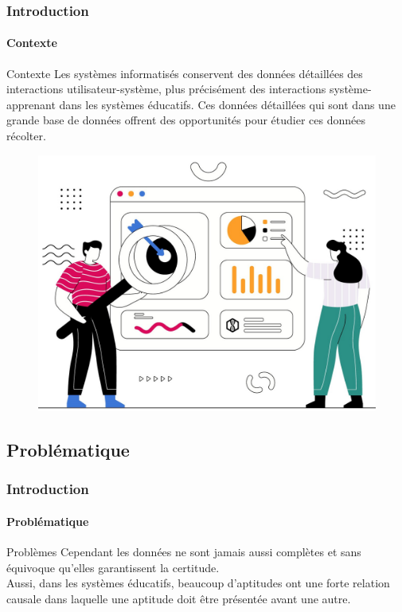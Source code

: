 \documentclass[aspectratio=169,professionalfonts, 12pt]{beamer}
\begin{document}
\begin{frame}
  \frametitle{Introduction}
  \framesubtitle{Contexte}
  \begin{minipage}{0.5\textwidth}
    \begin{block}{Contexte}
    Les systèmes informatisés conservent des données détaillées des interactions utilisateur-système, plus précisément des interactions système-apprenant dans les systèmes éducatifs. Ces données détaillées qui sont dans une grande base de données offrent des opportunités pour étudier ces données récolter.  
    \end{block}
  \end{minipage}
  \begin{minipage}{2cm}
  
  \end{minipage}
  \begin{minipage}{0.4\textwidth}
    \begin{figure}[t]
    \begin{center}
      \includegraphics[width=\textwidth]{images/etat_art/data_oppor.jpeg}
    \end{center}
    \end{figure} 
  \end{minipage}
\end{frame}


\subsection{Problématique}

\begin{frame}
  \frametitle{Introduction}
  \framesubtitle{Problématique}
  \justifying
  \begin{alertblock}{Problèmes}
  Cependant les données ne sont jamais aussi complètes et sans équivoque qu’elles garantissent la certitude. \\
  Aussi, dans les systèmes éducatifs, beaucoup d’aptitudes ont une forte relation causale dans laquelle une aptitude doit être présentée avant une autre.
\end{alertblock}
\end{frame}
\end{document}
